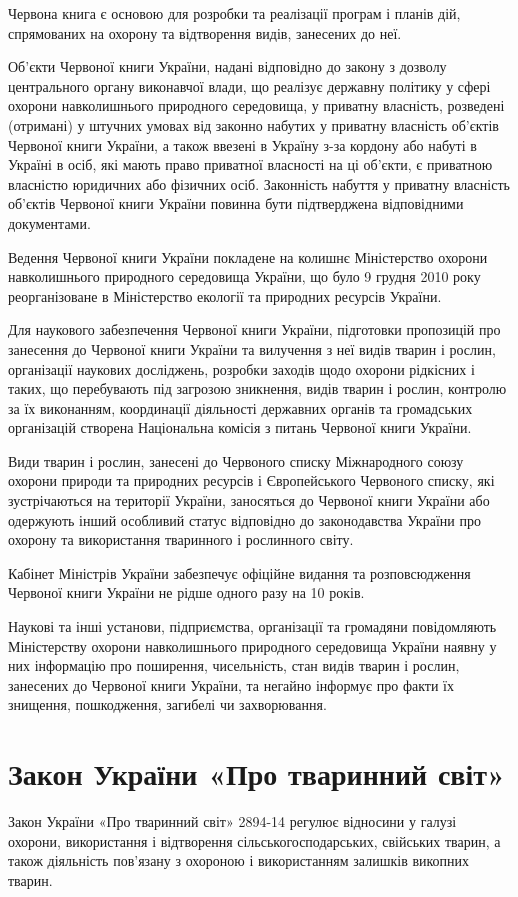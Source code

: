 \documentclass[a4paper,oneside,DIV=10,12pt]{scrreprt}
\begin{document}
			Червона книга є основою для розробки та реалізації програм і планів дій, спрямованих на охорону та відтворення видів, занесених до неї.
			
			Об'єкти Червоної книги України, надані відповідно до закону з дозволу центрального органу виконавчої влади, що реалізує державну політику у сфері охорони навколишнього природного середовища, у приватну власність, розведені (отримані) у штучних умовах від законно  набутих  у  приватну  власність  об'єктів  Червоної книги України, а також ввезені в  Україну з-за кордону або набуті в Україні в осіб, які мають право приватної власності на ці об'єкти, є приватною власністю юридичних або фізичних осіб. Законність набуття у приватну власність об'єктів Червоної книги України повинна бути підтверджена відповідними документами.
			
			Ведення Червоної книги України покладене на колишнє Міністерство охорони навколишнього природного середовища України, що було 9 грудня 2010 року реорганізоване в Міністерство екології та природних ресурсів України.
			
			Для наукового забезпечення Червоної книги України, підготовки пропозицій про занесення до Червоної книги України та вилучення з неї видів тварин і рослин, організації наукових досліджень, розробки заходів щодо охорони рідкісних і таких, що перебувають під загрозою зникнення, видів тварин і рослин, контролю за їх виконанням, координації діяльності державних органів та громадських організацій створена Національна комісія з питань Червоної книги України.
			
			Види тварин і рослин, занесені до Червоного списку Міжнародного союзу охорони природи та природних ресурсів і Європейського Червоного списку, які зустрічаються на території України, заносяться до Червоної книги України або одержують інший особливий статус відповідно до законодавства України про охорону та використання тваринного і рослинного світу.
			
			Кабінет Міністрів України забезпечує офіційне видання та розповсюдження Червоної книги України не рідше одного разу на 10 років.
			
			Наукові та інші установи, підприємства, організації та громадяни повідомляють Міністерству охорони навколишнього природного середовища України наявну у них інформацію про поширення, чисельність, стан видів тварин і рослин, занесених до Червоної книги України, та негайно інформує про факти їх знищення, пошкодження, загибелі чи захворювання.
			
		\section{Закон України «Про тваринний світ»}
			Закон України «Про тваринний світ» 2894-14 регулює відносини у галузі охорони, використання і відтворення сільськогосподарських, свійських тварин, а також діяльність пов'язану з охороною і використанням залишків викопних тварин.
			
\end{document}
